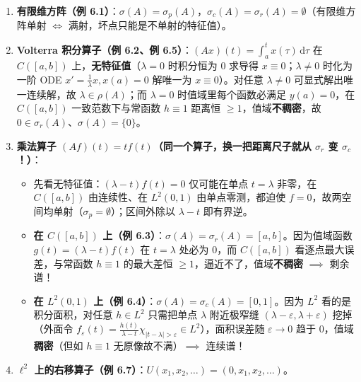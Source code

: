 \documentclass[11pt,a4paper]{article}
\providecommand{\tightlist}{\setlength{\itemsep}{2pt}\setlength{\parskip}{0pt}}
\begin{document}
\begin{enumerate}
\def\labelenumi{\arabic{enumi}.}
\tightlist
\item
  \textbf{有限维方阵（例 6.1）}：\(\sigma(A) = \sigma_p(A)\)，\(\sigma_c(A) = \sigma_r(A) = \emptyset\)（有限维方阵单射 \(\iff\) 满射，坏点只能是不单射的特征值）。
\item
  \textbf{Volterra 积分算子（例 6.2、例 6.5）}：\((Ax)(t) = \int_a^t x(\tau)\,\mathrm{d}\tau\) 在 \(C([a,b])\) 上，\textbf{无特征值}（\(\lambda = 0\) 时积分恒为 \(0\) 求导得 \(x\equiv 0\)；\(\lambda \neq 0\) 时化为一阶 ODE \(x' = \frac{1}{\lambda}x, x(a)=0\) 解唯一为 \(x\equiv 0\)）。对任意 \(\lambda \neq 0\) 可显式解出唯一连续解，故 \(\lambda \in \rho(A)\)；而 \(\lambda = 0\) 时值域里每个函数必满足 \(y(a)=0\)，在 \(C([a,b])\) 一致范数下与常函数 \(h \equiv 1\) 距离恒 \(\ge 1\)，值域\textbf{不稠密}，故 \(0 \in \sigma_r(A)\)、\(\sigma(A) = \{0\}\)。
\item
  \textbf{乘法算子 \((Af)(t) = t f(t)\)（同一个算子，换一把距离尺子就从 \(\sigma_r\) 变 \(\sigma_c\)！）}：

  \begin{itemize}
  \tightlist
  \item
    先看无特征值：\((\lambda - t)f(t) = 0\) 仅可能在单点 \(t=\lambda\) 非零，在 \(C([a,b])\) 由连续性、在 \(L^2(0,1)\) 由单点零测，都迫使 \(f = 0\)，故两空间均单射（\(\sigma_p = \emptyset\)）；区间外除以 \(\lambda - t\) 即有界逆。
  \item
    \textbf{在 \(C([a,b])\) 上（例 6.3）}：\(\sigma(A) = \sigma_r(A) = [a,b]\)。因为值域函数 \(g(t)=(\lambda-t)f(t)\) 在 \(t=\lambda\) 处必为 \(0\)，而 \(C([a,b])\) 看逐点最大误差，与常函数 \(h \equiv 1\) 的最大差恒 \(\ge 1\)，逼近不了，值域\textbf{不稠密} \(\implies\) 剩余谱！
  \item
    \textbf{在 \(L^2(0,1)\) 上（例 6.4）}：\(\sigma(A) = \sigma_c(A) = [0,1]\)。因为 \(L^2\) 看的是积分面积，对任意 \(h \in L^2\) 只需把单点 \(\lambda\) 附近极窄缝 \((\lambda-\varepsilon, \lambda+\varepsilon)\) 挖掉（外面令 \(f_\varepsilon(t) = \frac{h(t)}{\lambda-t}\chi_{|t-\lambda|>\varepsilon} \in L^2\)），面积误差随 \(\varepsilon \to 0\) 趋于 \(0\)，值域\textbf{稠密}（但如 \(h\equiv 1\) 无原像故不满）\(\implies\) 连续谱！
  \end{itemize}
\item
  \textbf{\(\ell^2\) 上的右移算子（例 6.7）}：\(U(x_1, x_2, \dots) = (0, x_1, x_2, \dots)\)。


\end{enumerate}
\end{document}
